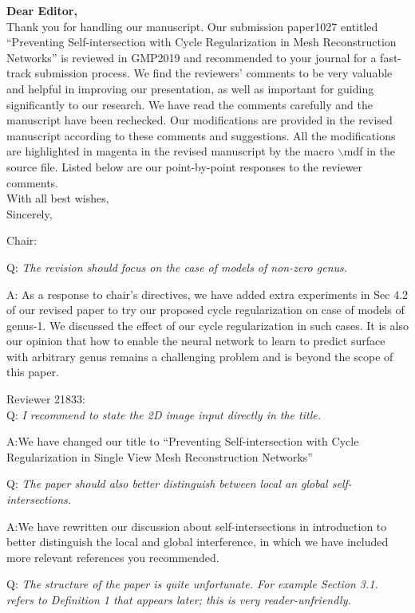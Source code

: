 \documentclass[10pt]{letter} %
\newcommand{\mdf}[1]{\textcolor[rgb]{1.00,0.00,1.00}{#1}}
\begin{document}
	\textbf{Dear Editor,}\\
	Thank you for handling our manuscript. Our submission paper1027 entitled ``Preventing Self-intersection with Cycle Regularization in Mesh
	Reconstruction Networks'' is reviewed in GMP2019 and recommended to your journal for a fast-track submission process. We find the reviewers’ comments to be very valuable and helpful in improving our presentation, as well as important for guiding significantly to our research. We have read the comments carefully and the manuscript have been rechecked. Our modifications are provided in the revised manuscript according to these comments and suggestions. All the modifications are \mdf{highlighted in magenta} in the revised manuscript by the macro $\backslash$mdf in the source file. Listed below are our point-by-point responses to the reviewer comments.\\
	With all best wishes,\\
	Sincerely,
	
	\hdashrule{\linewidth}{1pt}{1mm}
	Chair:
	
	Q: \emph{The revision should focus on the case of models of non-zero genus.}
	
	A: As a response to chair's directives, we have added extra experiments in Sec 4.2 of our revised paper to try our proposed cycle regularization on case of models of genus-1. We discussed the effect of our cycle regularization in such cases. It is also our opinion that how to enable the neural network to learn to predict surface with arbitrary genus remains a challenging problem and is beyond the scope of this paper. 
	
	\hdashrule{\linewidth}{1pt}{1mm}
	Reviewer 21833:\\
	Q: \emph{I recommend to state the 2D image input directly in the title.}
	
	A:We have changed our title to ``Preventing Self-intersection with Cycle Regularization in Single View Mesh Reconstruction Networks''
	
	Q: \emph{The paper should also better distinguish between local an global self-intersections.}
	
	A:We have rewritten our discussion about self-intersections in introduction to better distinguish the local and global interference, in which we have included more relevant references you recommended.
	
	Q: \emph{The structure of the paper is quite unfortunate. For example Section 3.1. refers to Definition 1 that appears later; this is very reader-unfriendly.}
	
\end{document}
